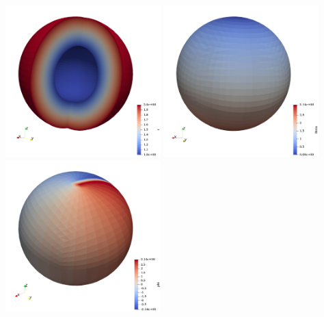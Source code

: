 \documentclass[a4paper]{article}
\begin{document}
\includegraphics[width=6cm]{images/tas/r}
\includegraphics[width=6cm]{images/tas/theta}
\includegraphics[width=6cm]{images/tas/phi}
\end{document}

